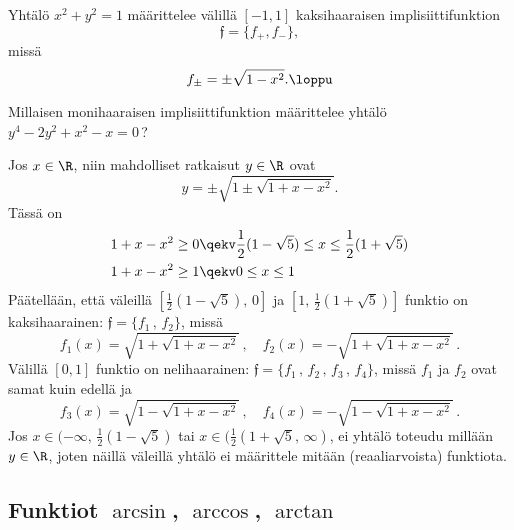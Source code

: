 \begin{Exa}
Yhtälö $x^2+y^2=1$ määrittelee välillä $[-1,1]$ kaksihaaraisen implisiittifunktion
\[
\mathfrak f=\{f_+,f_-\},
\]
missä
\[
f_\pm = \pm \sqrt{1-x^2}. \loppu
\]
\end{Exa}
\begin{Exa} Millaisen monihaaraisen implisiittifunktion määrittelee yhtälö \newline
$y^4-2y^2+x^2-x=0$\,?
\end{Exa}
\ratk Jos $x\in\R$, niin mahdolliset ratkaisut $y\in\R$ ovat
\[
y=\pm\sqrt{1\pm\sqrt{1+x-x^2}}.
\]
Tässä on
\begin{align*}
1+x-x^2 &\ge 0 \qekv \frac{1}{2}(1-\sqrt{5}) \le x \le \frac{1}{2}(1+\sqrt{5}) \\
1+x-x^2 &\ge 1 \qekv 0 \le x \le 1
\end{align*}
Päätellään, että väleillä $[\tfrac{1}{2}(1-\sqrt{5}),\,0]$ ja $[1,\,\tfrac{1}{2}(1+\sqrt{5})]$
funktio on kaksihaarainen: $\mathfrak{f}=\{f_1\,,\,f_2\}$, missä
\[
f_1(x)=\sqrt{1+\sqrt{1+x-x^2}}\,, \quad f_2(x)=-\sqrt{1+\sqrt{1+x-x^2}}\,.
\]
Välillä $[0,1]$ funktio on nelihaarainen: $\mathfrak{f}=\{f_1\,,\,f_2\,,\,f_3\,,\,f_4\}$,
missä $f_1$ ja $f_2$ ovat samat kuin edellä ja
\[
f_3(x)=\sqrt{1-\sqrt{1+x-x^2}}\,, \quad  f_4(x)=-\sqrt{1-\sqrt{1+x-x^2}}\,.
\]
Jos $x\in(-\infty,\,\tfrac{1}{2}(1-\sqrt{5})$ tai $x\in(\tfrac{1}{2}(1+\sqrt{5},\,\infty)$,
ei yhtälö toteudu millään $y\in\R$, joten näillä väleillä yhtälö ei määrittele mitään
(reaaliarvoista) funktiota. \loppu 

\subsection{Funktiot $\arcsin$, $\arccos$, $\arctan$}

